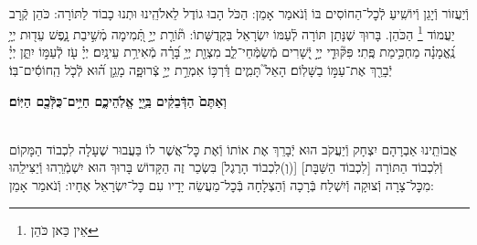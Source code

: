 \documentclass[twoside, openany, parskip=half, 11pt]{book}
\begin{document}
\avharachamim

\\
וְֿיַעֲזוֹר וְֿיָגֵן וְֿיוֹשִֽׁיעַ לְֿכׇל־הַחוֹסִים בּוֹ וְֿנֹאמַר אָמֵן:
הַכֹּל הָבוּ גוֹדֶל לֵאלֹהֵֽינוּ וּתְנוּ כָבוֹד לַתּוֹרָה: כֹּהֵן קְֿרָב יַעֲמוֹד
\footnote{ אֵין כַּאן כֹּהֵן}
הַכֹּהֵן. בָּרוּךְ שֶׁנָּתַן תּוֹרָה לְֿעַמּוֹ יִשְׂרָאֵל בִּקְדֻשָּׁתוֹ:
תּ֘וֹרַ֤ת יְיָ֣ תְּֿ֭מִימָה מְֿשִׁ֣יבַת נָ֑פֶשׁ עֵד֖וּת יְיָ֥ נֶֽ֝אֱמָנָ֗ה מַחְכִּ֥ימַת פֶּֽתִי׃ פִּקּ֘וּדֵ֤י יְיָ֣ יְֿ֭שָׁרִים מְֿשַׂמְּֿחֵי־לֵ֑ב מִצְוַ֖ת יְיָ֥ בָּ֝רָ֗ה מְֿאִירַ֥ת עֵינָֽיִם׃
יְיָ֗ עֹ֖ז לְֿעַמּ֣וֹ יִתֵּ֑ן יְיָ֓ יְֿבָרֵ֖ךְ אֶת־עַמּ֣וֹ בַשָּׁלֽוֹם׃
הָאֵל֮ תָּמִ֢ים דַּ֫רְכּ֥וֹ אִמְרַ֣ת יְיָ֣ צְֿרוּפָ֑ה מָגֵ֥ן ה֝֗וּא לְֿכֹ֤ל הַֽחוֹסִ֬ים־בּֽוֹ׃


\textbf{וְאַתֶּם֙ הַדְּֿבֵקִ֔ים בַּֽיְ֖יָ אֱלֹֽהֵיכֶ֑ם חַיִּ֥ים־כֻּלְּֿכֶ֖ם הַיּֽוֹם׃} 

\nextpage

\torahbarachu

\hagomel

\\
אֲבוֹתֵֽינוּ אַבְרָהָם יִצְחָק וְֿיַעֲקֹב הוּא יְֿבָרֵךְ אֶת
אוֹתוֹ וְֿאֶת כׇּל־אֲשֶׁר לוֹ
בַּעֲבוּר שֶׁעָלָה לִכְבוֹד הַמָּקוֹם וְֿלִכְבוֹד הַתּוֹרָה
[לִכְבוֹד הַשַּׁבָּת]
[(וְ)לִכְבוֹד הָרֶגֶל]
בִּשְׂכַר זֶה הַקָּדוֹשׁ בָּרוּךְ הוּא יִשְׁמְֿרֵֽהוּ וְֿיַצִּילֵֽהוּ מִכׇּל־צָרָה וְֿצוּקָה וְֿיִשְׁלַח בְּֿרָכָה וְֿהַצְלָחָה בְּֿכׇל־מַעֲשֵׂה יָדָיו עִם כׇּל־יִשְׂרָאֵל אֶחָיו: וְֿנֹאמַר אָמֵן:
\end{document}
